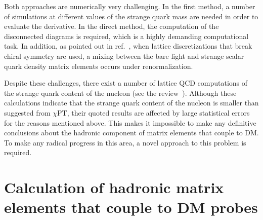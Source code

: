 \documentclass[aps,prc,twocolumn,showpacs,floatfix,nofootinbib,preprintnumbers,superscriptaddress,amsmath,amssymb]{revtex4-1}
\begin{document}
Both approaches are numerically very challenging. In the first method, a number 
of simulations at different values of the strange quark mass are needed in order to evaluate the derivative.  
In the direct method, the computation of the disconnected diagrams is required, 
which is a highly demanding computational task. %
In addition, as pointed out in ref.~\cite{Michael:2001bv}, when lattice 
discretizations that break chiral symmetry are used, a  
mixing between the bare light and strange scalar quark density matrix elements occurs 
under renormalization. %

Despite these challenges, there exist a number of lattice QCD computations of the strange quark 
content of the nucleon (see the review~\cite{Young:2009ps}).
Although these calculations indicate that the strange quark content of the 
nucleon is smaller than suggested from 
$\chi$PT, their quoted results are affected by large statistical errors for the reasons mentioned above.
This makes it impossible to make any definitive conclusions about the hadronic component of matrix elements that couple to DM.  To make any radical progress in this area, a novel approach to this problem is required.

\section*{Calculation of hadronic matrix elements that couple to DM probes}
\end{document}
